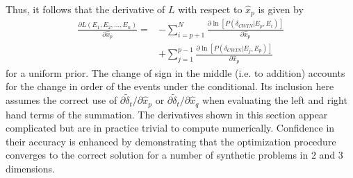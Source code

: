 \documentclass[extra, onecolumn, doublespacing]{gji}
\begin{document}
Thus, it follows that the derivative of $L$ with respect to $\hat{x}_p$ is given by
\begin{equation}
\label{eq-derivative-Lstar-cwionly}
\begin{array}{ll}
\frac{\partial L(E_1, E_2, ..., E_n)}{\partial \hat{x}_p} = &
- \sum_{i=p+1}^{N} \frac{ \partial \ln \left[P(\delta_{CWIN}|E_p,E_i)\right]}{\partial \hat{x}_p} \\
 & + \sum_{j=1}^{p-1} \frac{ \partial \ln \left[P(\delta_{CWIN}|E_j,E_p)\right]}{\partial \hat{x}_p}
\end{array}
\end{equation}
%
for a uniform prior. The change of sign in the middle (i.e. to
addition) accounts for the change in order of the events under the
conditional. Its inclusion here assumes the correct use of $\partial
\widetilde{\delta}_t / \partial \hat{x}_p$ or $\partial
\widetilde{\delta}_t / \partial \hat{x}_q$ when evaluating the left
and right hand terms of the summation. The derivatives shown in this
section appear complicated but are in practice trivial to compute
numerically. Confidence in their accuracy is enhanced by
demonstrating that the optimization procedure converges to the
correct solution for a number of synthetic problems in 2 and 3
dimensions.


\clearpage









\label{lastpage}
\end{document}
